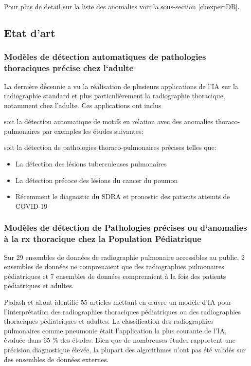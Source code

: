                 Pour plus de detail sur la liste des anomalies voir la sous-section \ref{chexpertDB}.

        \subsection{Etat d'art}
            \subsubsection{Modèles de détection automatiques de pathologies thoraciques précise chez l‘adulte}
            La dernière décennie a vu la réalisation de plusieurs applications de l'IA sur la radiographie standard et plus particulièrement la radiographie thoracique, notamment chez l'adulte.
            Ces applications ont inclus 
            
            soit la détection automatique de motifs en relation avec des anomalies thoraco-pulmonaires par exemples les études suivantes:
            
            soit la détection de pathologies thoraco-pulmonaires précises telles que:
            
            \begin{itemize}[label=$\bullet$]
                \item La détection des lésions tuberculeuses pulmonaires
                \item La détection précoce des lésions du cancer du poumon
                \item Récemment le diagnostic du SDRA et pronostic des patients atteints de COVID-19
            \end{itemize}

            \subsubsection{Modèles de détection de Pathologies précises ou d‘anomalies à la rx thoracique chez la Population Pédiatrique}

                Sur 29 ensembles de données de radiographie pulmonaire accessibles au public, 2 ensembles de données ne comprenaient que des radiographies pulmonaires pédiatriques et 7 ensembles de données comprenaient à la fois des patients pédiatriques et adultes. 

                Padash et al.ont identifié 55 articles mettant en œuvre un modèle d'IA pour l'interprétation des radiographies thoraciques pédiatriques ou des radiographies thoraciques pédiatriques et adultes. La classification des radiographies pulmonaires comme pneumonie était l'application la plus courante de l'IA, évaluée dans 65 \% des études. Bien que de nombreuses études rapportent une précision diagnostique élevée, la plupart des algorithmes n'ont pas été validés sur des ensembles de données externes.


